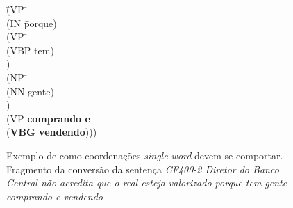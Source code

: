 \begin{figure}[!h]
    \centering
    \begin{minipage}{10cm}
        \begin{tabbing}
            \=(VP \=\+\\
            \>    (IN \=porque)\+\\
            \>        (VP \=\+\\
            \>            (VBP tem)\-\\
            \>        )\\
            \>        (NP \=\+\\
            \>            (NN gente)\-\\
            \>        )\\
            \>        (VP \=\textbf{comprando e}\+\\
            \>            (\textbf{VBG vendendo})))
        \end{tabbing}
    \end{minipage}
    \caption[Exemplo de como coordenações \textit{single word} devem se comportar]{Exemplo de como coordenações \textit{single word} devem se comportar. Fragmento da conversão da sentença \textit{CF400-2 Diretor do Banco Central não acredita que o real esteja valorizado porque \guillemotleft tem gente comprando e vendendo\guillemotright}}
    \label{fig:bosque_exemplo_flat}
\end{figure}

